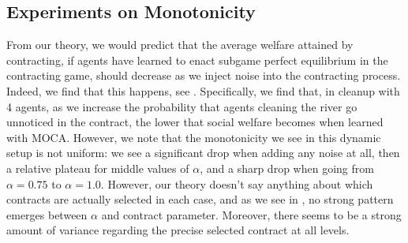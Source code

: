 \documentclass[referee,sn-basic]{sn-jnl}
\theoremstyle{thmstyleone}%
\theoremstyle{thmstyletwo}%
\theoremstyle{thmstylethree}%
\begin{document}
\subsection{Experiments on Monotonicity} 
From our theory, we would predict that the average welfare attained by contracting, if agents have learned to enact subgame perfect equilibrium in the contracting game, should decrease as we inject noise into the contracting process. Indeed, we find that this happens, see . Specifically, we find that, in cleanup with 4 agents, as we increase the probability that agents cleaning the river go unnoticed in the contract, the lower that social welfare becomes when learned with MOCA. However, we note that the monotonicity we see in this dynamic setup is not uniform: we see a significant drop when adding any noise at all, then a relative plateau for middle values of $\alpha$, and a sharp drop when going from $\alpha=0.75$ to $\alpha=1.0$. However, our theory doesn't say anything about which contracts are actually selected in each case, and as we see in , no strong pattern emerges between  $\alpha$ and contract parameter. Moreover, there seems to be a strong amount of variance regarding the precise selected contract at all levels. 
\end{document}
